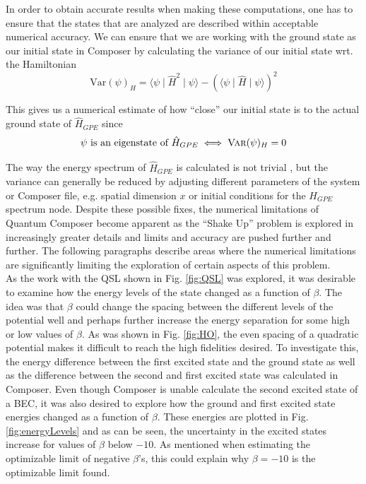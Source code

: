 \documentclass[a4paper, twocolumn]{revtex4-1}
\begin{document}
In order to obtain accurate results when making these computations, one has to ensure that the states that are analyzed are described within acceptable numerical accuracy. We can ensure that we are working with the ground state as our initial state in Composer by calculating the variance of our initial state wrt. the Hamiltonian
\begin{equation}
	\text{Var}(\psi)_H = \langle \psi \mid \hat{H}^2 \mid \psi \rangle - \left(\langle \psi \mid \hat{H} \mid \psi \rangle\right)^2
\end{equation}

This gives us a numerical estimate of how ``close'' our initial state is to the actual ground state of $\hat{H}_{GPE}$ since
\begin{equation}
	\psi \text{ is an eigenstate of } \hat{H}_{GPE} \iff \textsc{Var}(\psi)_H = 0
\end{equation}

The way the energy spectrum of $\hat{H}_{GPE}$ is calculated is not trivial \cite{QEngine}, but the variance can generally be reduced by adjusting different parameters of the system or Composer file, e.g. spatial dimension $x$ or initial conditions for the $H_{GPE}$ spectrum node. Despite these possible fixes, the numerical limitations of Quantum Composer become apparent as the ``Shake Up'' problem is explored in increasingly greater details and limits and accuracy are pushed further and further. The following paragraphs describe areas where the numerical limitations are significantly limiting the exploration of certain aspects of this problem.\\

As the work with the QSL shown in Fig. \ref{fig:QSL} was explored, it was desirable to examine how the energy levels of the state changed as a function of $\beta$. The idea was that $\beta$ could change the spacing between the different levels of the potential well and perhaps further increase the energy separation for some high or low values of $\beta$. As was shown in Fig. \ref{fig:HO}, the even spacing of a quadratic potential makes it difficult to reach the high fidelities desired. To investigate this, the energy difference between the first excited state and the ground state as well as the difference between the second and first excited state was calculated in Composer. %
Even though Composer is unable calculate the second excited state of a BEC, it was also desired to explore how the ground and first excited state energies changed as a function of $\beta$. These energies are plotted in Fig. \ref{fig:energyLevels} and as can be seen, the uncertainty in the excited states increase for values of $\beta$ below $-10$. As mentioned when estimating the optimizable limit of negative $\beta$'s, this could explain why $\beta=-10$ is the optimizable limit found.\\
\end{document}
